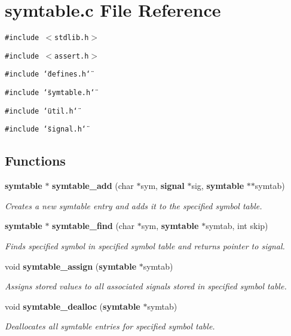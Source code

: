 \section{symtable.c File Reference}
\label{symtable_8c}
{\tt \#include $<$stdlib.h$>$}\par
{\tt \#include $<$assert.h$>$}\par
{\tt \#include \char`\"{}defines.h\char`\"{}}\par
{\tt \#include \char`\"{}symtable.h\char`\"{}}\par
{\tt \#include \char`\"{}util.h\char`\"{}}\par
{\tt \#include \char`\"{}signal.h\char`\"{}}\par
\subsection*{Functions}
\begin{CompactItemize}
\item 
{\bf symtable} $\ast$ {\bf symtable\_\-add} (char $\ast$sym, {\bf signal} $\ast$sig, {\bf symtable} $\ast$$\ast$symtab)
\begin{CompactList}\small\item\em Creates a new symtable entry and adds it to the specified symbol table.\item\end{CompactList}\item 
{\bf symtable} $\ast$ {\bf symtable\_\-find} (char $\ast$sym, {\bf symtable} $\ast$symtab, int skip)
\begin{CompactList}\small\item\em Finds specified symbol in specified symbol table and returns pointer to signal.\item\end{CompactList}\item 
void {\bf symtable\_\-assign} ({\bf symtable} $\ast$symtab)
\begin{CompactList}\small\item\em Assigns stored values to all associated signals stored in specified symbol table.\item\end{CompactList}\item 
void {\bf symtable\_\-dealloc} ({\bf symtable} $\ast$symtab)
\begin{CompactList}\small\item\em Deallocates all symtable entries for specified symbol table.\item\end{CompactList}\end{CompactItemize}



